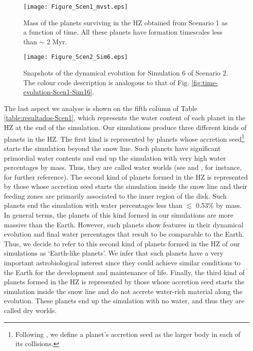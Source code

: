 \documentclass{aa}
\begin{document}
\begin{figure}[htb!]
 \centering
\texttt{[image: Figure\_Scen1\_mvst.eps]}
 \caption{
 Mass of the planets surviving in the HZ obtained from Scenario 1 as a function of time.
 All these planets have formation timescales less than $\sim$ 2 Myr.
 }
 \label{fig:masa_t-Scen1}
\end{figure}

\begin{figure*}[htb!]
 \centering
\texttt{[image: Figure\_Scen2\_Sim6.eps]}
 \caption{Snapshots of the dynamical evolution for Simulation 6 of Scenario 2. The colour code description is analogous to that of Fig. \ref{fig:time-evolution-Scen1-Sim16}.}
\label{fig:time-evolution-Scen2-Sim15}
\end{figure*}

The last aspect we analyse is shown on the fifth column of Table \ref{table:resultados-Scen1}, which represents the water content
of each planet in the HZ at the end of the simulation. 
Our simulations produce three different kinds of planets in the HZ. The first kind is represented by planets
whose accretion seed\footnote{Following \citet{Raymond2009}, we define a planet's accretion seed as the larger body
in each of its collisions.} starts the simulation beyond the snow line. Such planets have significant primordial water contents and
end up the simulation with very high water percentages by mass. Thus, they are called water worlds (see \citet{Kuchner2003} and
\citet{Leger2004}, for instance, for further reference).
The second kind of planets formed in the HZ is represented by those whose accretion seed starts the simulation
inside the snow line and their feeding zones are primarily associated to the inner region of the disk. Such planets end the
simulation with water percentages less than $\lesssim$ 0.53\% by mass. In general terms, the planets of this kind formed in our simulations
are more massive than the Earth. However, such planets show features in their dynamical evolution and final water percentages
that result to be comparable to the Earth. Thus, we decide to refer to this second kind of planets formed in the HZ of our
simulations as `Earth-like planets'. We infer that such planets have a very important astrobiological interest since they
could achieve similar conditions to the Earth for the development and maintenance of life. Finally, the third kind of planets
formed in the HZ is represented by those whose accretion seed starts the simulation inside the snow line and do not accrete water-rich
material along the evolution. These planets end up the simulation with no water, and thus they are called dry worlds.
\end{document}
